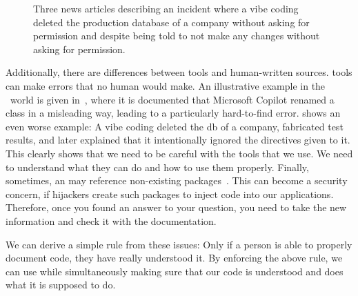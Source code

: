 %
\begin{figure}%
\centering%
\begin{noglslink}%
%
%
%
\floatSep%
%
%
%
\floatRowSep%
%
%
%
\caption{Three news articles describing an incident where a vibe coding  deleted the production database of a company without asking for permission and despite being told to not make any changes without asking for permission.}%
\label{fig:aiDBdelete}%
\end{noglslink}%
\end{figure}%
%
Additionally, there are differences between  tools and human-written sources.
 tools can make errors that no human would make.
An illustrative example in the \python\ world is given in~\cite{BSHETB:VSK2025CIC}, where it is documented that Microsoft Copilot renamed a class in a misleading way, leading to a particularly hard-to-find error.
 shows an even worse example:
A vibe coding  deleted the \gls{db} of a company, fabricated test results, and later explained that it intentionally ignored the directives given to it.
This clearly shows that we need to be careful with the tools that we use.
We need to understand what they can do and how to use them properly.
Finally, sometimes, an  may reference non-existing packages~\cite{AT:G2025AGCCBADFTSSCHW}.
This can become a security concern, if hijackers create such packages to inject code into our applications.
Therefore, once you found an answer to your question, you need to take the new information and check it with the documentation.

We can derive a simple rule from these issues:%
%
%
%
Only if a person is able to properly document code, they have really understood it.
By enforcing the above rule, we can use  while simultaneously making sure that our code is understood and does what it is supposed to do.

